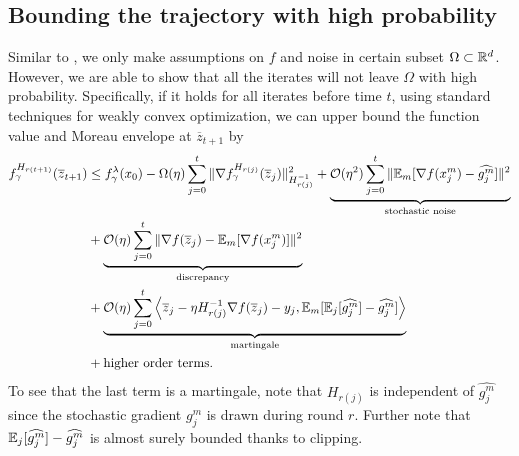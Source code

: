 \documentclass{article} %
\numberwithin{equation}{section}
\begin{document}
\subsection{Bounding the trajectory with high probability}
    Similar to \cite{pmlr-v202-sadiev23a}, we only make assumptions on $f$ and noise in certain subset $\Omega\subset \mathbb{R}^d$. 
    However, we are able to show that all the iterates will not leave $\Omega$ with high probability.
    Specifically, if it holds for all iterates before time $t$, using standard techniques for weakly convex optimization, we can upper bound the function value and Moreau envelope at $\overline{z}_{t+1}$ by 
    \begin{equation}\label{main:eq:descent}
        \begin{aligned}
            f_\gamma^{H_{r(t+1)}}(\overline{z}_{t+1}) 
            &\leq f_{\gamma}^{\lambda}(x_0) - \Omega(\eta) \sum_{j=0}^t\|\nabla f_\gamma^{H_{r(j)}}(\overline{z}_j)\|_{H_{r(j)}^{-1}}^2 + \underbrace{\mathcal{O}(\eta^2)\sum_{j=0}^t\|\mathbb{E}_m[\nabla f(x_j^m)-\widehat{g_j^m}]\|^2}_{\text{stochastic noise}} \\
            &+ \underbrace{\mathcal{O}(\eta)\sum_{j=0}^t\|\nabla f(\overline{z}_j)-\mathbb{E}_m[\nabla f(x_j^m)]\|^2}_{\text{discrepancy}} \\
            &+ \underbrace{\mathcal{O}(\eta) \sum_{j=0}^t\left\langle \overline{z}_{j}-\eta H_{r(j)}^{-1}\nabla f(\overline{z}_j)-y_j, \mathbb{E}_m[\mathbb{E}_j[\widehat{g_j^m}]-\widehat{g_j^m}]\right\rangle}_{\text{martingale}}\\
            & + \text{higher order terms}.
        \end{aligned}
    \end{equation}
    To see that the last term is a martingale, note that $H_{r(j)}$ is independent of $\widehat{g_j^m}$ since the stochastic gradient $\widehat{g_j^m}$ is drawn during round $r$. Further note that $\mathbb{E}_j[\widehat{g_j^m}]-\widehat{g_j^m}$ is almost surely bounded thanks to clipping.
\end{document}
